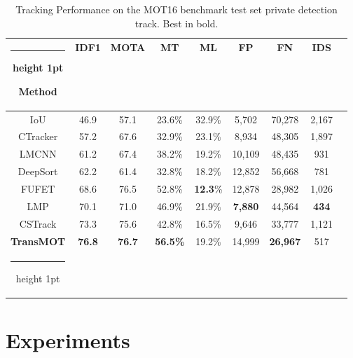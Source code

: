 \documentclass[10pt,twocolumn,letterpaper]{article}
\makeatletter
\newcommand{\thickhline}{\noalign {\ifnum 0=`}\fi \hrule height 1pt
    \futurelet \reserved@a \@xhline
}
\makeatother
\begin{document}
\begin{table}
	\footnotesize
	\begin{center}
		
		\begin{tabular}{c@{\hskip 0.1mm}|@{\hskip 1.5mm}c@{\hskip 1.5mm}c@{\hskip 1.5mm}c@{\hskip 1.5mm}c@{\hskip 1.5mm}c@{\hskip 1.5mm}c@{\hskip 1.5mm}c@{\hskip 1.5mm}c@{\hskip 1.5mm}}
			\hline\thickhline
			 Method & IDF1 & MOTA & MT & ML & FP & FN & IDS\\
			\hline
			
			IoU\cite{bochinski2017high} & 46.9 & 57.1 & 23.6\% &32.9\% &5,702& 70,278 &2,167 \\
			
			CTracker\cite{peng2020chained} & 57.2 & 67.6 & 32.9\% &23.1\% &8,934 &48,305 &1,897 \\
			




			LMCNN \cite{babaee2019dual}& 61.2& 67.4 & 38.2\%& 19.2\%& 10,109 &48,435 &931\\
			
			DeepSort \cite{wojke2017simple} & 62.2 & 61.4 & 32.8\%& 18.2\% & 12,852 & 56,668 & 781\\
			
			FUFET \cite{shan2020fgagt}& 68.6 & 76.5 & 52.8\%& \textbf{12.3}\%& 12,878& 28,982 &1,026\\
			
LMP \cite{tang2017multiple}& 70.1 & 71.0 & 46.9\%& 21.9\%& \textbf{7,880}& 44,564 &\textbf{434}\\
CSTrack \cite{liang2020rethinking}& 73.3 & 75.6 & 42.8\%& 16.5\%& 9,646	 & 33,777 & 1,121\\
			\hline

			 \textbf{TransMOT} &\textbf{76.8}&\textbf{76.7}&\textbf{56.5\%} &19.2\% &14,999  &\textbf{26,967} & 517\\
			\hline\thickhline
		\end{tabular}
\end{center}
	\vspace{-2mm}
	\caption{Tracking Performance on the MOT16 benchmark test set private detection track. Best in bold.}
	\label{table:res16p}
\end{table} 
 
 

\section{Experiments}
\end{document}
